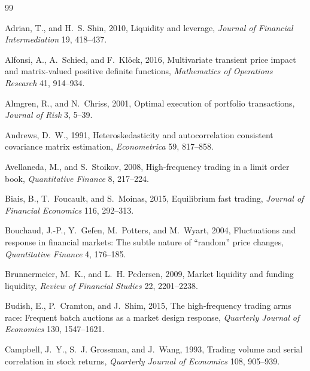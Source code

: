 \documentclass[12pt]{article}
\theoremstyle{definition}
\theoremstyle{remark}
\begin{document}
\newpage
\begin{thebibliography}{99}
\small
\setlength{\itemsep}{0.0pt plus 0.3pt}
\setlength{\parsep}{0.0pt}

Adrian, T., and H.~S. Shin, 2010, Liquidity and leverage, \emph{Journal of Financial Intermediation} 19, 418--437.

Alfonsi, A., A.~Schied, and F.~Kl\"ock, 2016, Multivariate transient price impact and matrix-valued positive definite functions, \emph{Mathematics of Operations Research} 41, 914--934.

Almgren, R., and N.~Chriss, 2001, Optimal execution of portfolio transactions, \emph{Journal of Risk} 3, 5--39.

Andrews, D.~W., 1991, Heteroskedasticity and autocorrelation consistent covariance matrix estimation, \emph{Econometrica} 59, 817--858.

Avellaneda, M., and S.~Stoikov, 2008, High-frequency trading in a limit order book, \emph{Quantitative Finance} 8, 217--224.

Biais, B., T.~Foucault, and S.~Moinas, 2015, Equilibrium fast trading, \emph{Journal of Financial Economics} 116, 292--313.

Bouchaud, J.-P., Y.~Gefen, M.~Potters, and M.~Wyart, 2004, Fluctuations and response in financial markets: The subtle nature of ``random'' price changes, \emph{Quantitative Finance} 4, 176--185.

Brunnermeier, M.~K., and L.~H. Pedersen, 2009, Market liquidity and funding liquidity, \emph{Review of Financial Studies} 22, 2201--2238.

Budish, E., P.~Cramton, and J.~Shim, 2015, The high-frequency trading arms race: Frequent batch auctions as a market design response, \emph{Quarterly Journal of Economics} 130, 1547--1621.

Campbell, J.~Y., S.~J. Grossman, and J.~Wang, 1993, Trading volume and serial correlation in stock returns, \emph{Quarterly Journal of Economics} 108, 905--939.


\end{thebibliography}
\end{document}
